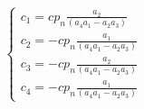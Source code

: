 \begin{equation*}
    \begin{cases}
        c_1 = c p_n \frac{a_2}{(a_4 a_1 - a_2 a_3)} \\
        c_2 = - c p_n \frac{a_1}{(a_4 a_1 - a_2 a_3)} \\
        c_3 = -c p_n \frac{a_2}{(a_4 a_1 - a_2 a_3)} \\
        c_4 = - c p_n \frac{a_1}{(a_4 a_1 - a_2 a_3)}
    \end{cases}
\end{equation*}